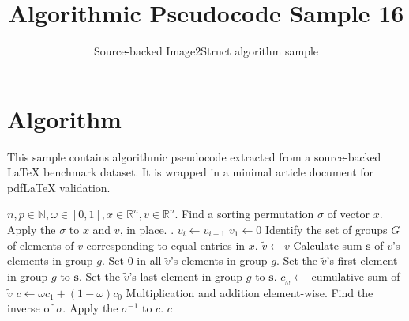 \documentclass[11pt]{article}
\title{Algorithmic Pseudocode Sample 16}
\author{Source-backed Image2Struct algorithm sample}
\date{}
\begin{document}
\maketitle
\section{Algorithm}
This sample contains algorithmic pseudocode extracted from a source-backed LaTeX benchmark dataset. It is wrapped in a minimal article document for pdfLaTeX validation.

\begin{algorithm}[htbp]
\caption{Source-backed algorithmic procedure}
\begin{algorithmic}[1]
\Require $n,p\in\mathbb N, \omega \in [0,1], x\in\mathbb R^n, v \in\mathbb R^{n}$.
\State Find a sorting permutation $\sigma$ of vector $x$.
\State Apply the $\sigma$ to $x$ and $v$, in place.
.
\State $v_{i} \gets v_{i-1}$
\EndFor
\State $v_{1} \gets 0$
\EndIf
\State Identify the set of groups $G$ of elements of $v$ corresponding to equal entries in $x$.
\State $\tilde v \gets v$
\State Calculate sum $\mathbf s$ of $v$'s elements in group $g$.
\State Set $0$ in all $\tilde v$'s elements in group $g$.
\State Set the $\tilde v$'s first element in group $g$ to $\mathbf s$.
\Else
\State Set the $\tilde v$'s last element in group $g$ to $\mathbf s$.
\EndIf
\EndFor
\State $c_{\tilde \omega} \gets$ cumulative sum of $\tilde v$
\EndFor
\State $c \gets \omega c_1 + (1-\omega)c_0$
\Comment Multiplication and addition element-wise.
\State Find the inverse of $\sigma$.
\State Apply the $\sigma^{-1}$ to $c$.
\State \Return $c$
\end{algorithmic}
\end{algorithm}
\end{document}
